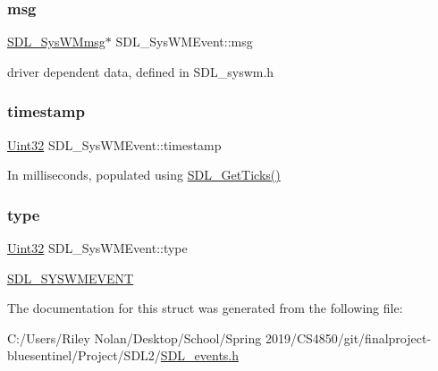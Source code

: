 \subsubsection{\texorpdfstring{msg}{msg}}
{\footnotesize\ttfamily \mbox{\hyperlink{struct_s_d_l___sys_w_mmsg}{S\+D\+L\+\_\+\+Sys\+W\+Mmsg}}$\ast$ S\+D\+L\+\_\+\+Sys\+W\+M\+Event\+::msg}

driver dependent data, defined in S\+D\+L\+\_\+syswm.\+h \mbox{\label{struct_s_d_l___sys_w_m_event_a5d3cb97006d99b620c2671c27bd82c06}} 
\subsubsection{\texorpdfstring{timestamp}{timestamp}}
{\footnotesize\ttfamily \mbox{\hyperlink{_s_d_l__stdinc_8h_add440eff171ea5f55cb00c4a9ab8672d}{Uint32}} S\+D\+L\+\_\+\+Sys\+W\+M\+Event\+::timestamp}

In milliseconds, populated using \mbox{\hyperlink{_s_d_l__timer_8h_a0b9bc71d6287e0ffafdc3419760fe2b3}{S\+D\+L\+\_\+\+Get\+Ticks()}} \mbox{\label{struct_s_d_l___sys_w_m_event_a84697e96cb16bf6a570e10b5bfdcd392}} 
\subsubsection{\texorpdfstring{type}{type}}
{\footnotesize\ttfamily \mbox{\hyperlink{_s_d_l__stdinc_8h_add440eff171ea5f55cb00c4a9ab8672d}{Uint32}} S\+D\+L\+\_\+\+Sys\+W\+M\+Event\+::type}

\mbox{\hyperlink{_s_d_l__events_8h_a3b589e89be6b35c02e0dd34a55f3fccaa73749d735a18ce6ef17a09ee70d5dbe7}{S\+D\+L\+\_\+\+S\+Y\+S\+W\+M\+E\+V\+E\+NT}} 

The documentation for this struct was generated from the following file\+:\begin{DoxyCompactItemize}
\item 
C\+:/\+Users/\+Riley Nolan/\+Desktop/\+School/\+Spring 2019/\+C\+S4850/git/finalproject-\/bluesentinel/\+Project/\+S\+D\+L2/\mbox{\hyperlink{_s_d_l__events_8h}{S\+D\+L\+\_\+events.\+h}}\end{DoxyCompactItemize}
